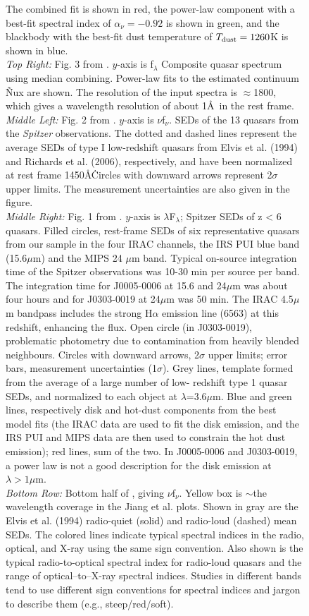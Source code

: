 \documentclass[11pt,a4paper]{article}
\begin{document}
\begin{figure}
{The combined fit is shown in red, the power-law component with a best-fit spectral index of $\alpha_{\nu}=-0.92$ is shown in green, and the blackbody with the best-fit dust temperature of $T_{\rm dust}=1260$K  is shown in blue.\\
{\it Top Right:} Fig. 3 from \citet{VdB2001}. $y$-axis is f$_{\lambda}$ Composite quasar spectrum using median combining. Power-law fits to the estimated continuum Ñux are shown. The resolution of the input spectra is $\approx$1800, which gives a wavelength resolution of about 1\AA\ in the rest frame. \\
{\it Middle Left:} Fig. 2 from \citet{Jiang2006}. $y$-axis is $\nu$f$_{\nu}$.  SEDs of the 13 quasars from the {\it Spitzer} observations. The dotted and dashed lines represent the average SEDs of type I low-redshift quasars from Elvis et al. (1994) and Richards et al. (2006),  respectively, and have been normalized at rest frame 1450\AA\. Circles with downward arrows represent 2$\sigma$ upper limits. The measurement uncertainties are also given in the figure.\\
{\it Middle Right:} Fig. 1 from \citet{Jiang2010}. $y$-axis is $\lambda$F$_{\lambda}$;  Spitzer SEDs of z < 6 quasars. Filled circles, rest-frame SEDs of six representative quasars from our sample in the four IRAC channels, the IRS PUI blue band (15.6$\mu$m) and the MIPS 24 $\mu$m band. 
Typical on-source integration time of the Spitzer observations was 10-30 min per source per band. The integration time for J0005-0006 at 15.6 and 24$\mu$m was about four hours and for J0303-0019 at 24$\mu$m was 50 min. The IRAC 4.5$\mu$m bandpass includes the strong H$\alpha$ emission line (6563) 
at this redshift, enhancing the flux. Open circle (in J0303-0019), problematic photometry due to contamination from heavily blended neighbours. Circles with downward arrows, 2$\sigma$ upper limits; error bars, measurement uncertainties (1$\sigma$). Grey lines, template formed from the average of a large number of low- redshift type 1 quasar SEDs, and normalized to each object at $\lambda$=3.6$\mu$m. Blue and green lines, respectively disk and hot-dust components from the best model fits (the IRAC data are used to fit the disk emission, and the IRS PUI and MIPS data are then used to constrain the hot dust emission); red lines, sum of the two. In J0005-0006 and J0303-0019, a power law is not a good description for the disk emission at $\lambda > 1\mu$m.\\
{\it Bottom Row:} Bottom half of \citet{Richards2006b}, giving $\nu$f$_{\nu}$. Yellow box is $\sim$the wavelength coverage in the Jiang et al. plots. Shown in gray are the Elvis et al. (1994) radio-quiet (solid) and radio-loud (dashed) mean SEDs. The colored lines indicate typical spectral indices in the radio, optical, and X-ray using the same sign convention. Also shown is the typical radio-to-optical spectral index for radio-loud quasars and the range of optical–to–X-ray spectral indices. Studies in different bands tend to use different sign conventions for spectral indices and jargon to describe them (e.g., steep/red/soft). 
}
\end{figure}
\end{document}
